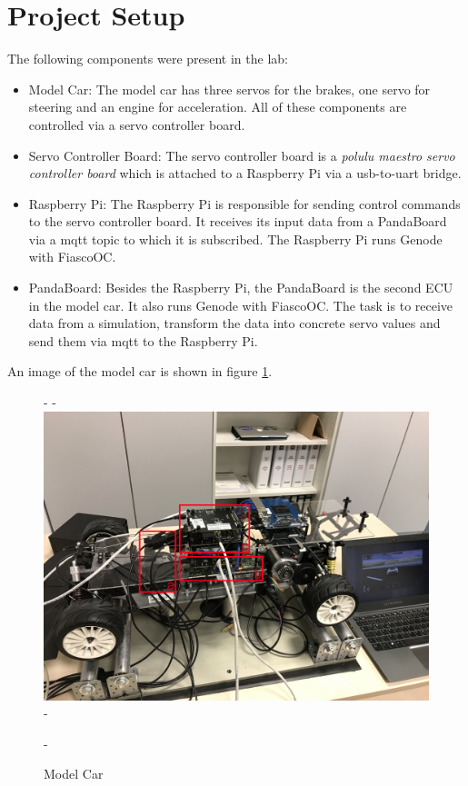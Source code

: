 \section{Project Setup}
The following components were present in the lab:

\begin{itemize}
    \item Model Car: The model car has three servos for the brakes, one servo for steering and an engine for acceleration. All of these components are controlled via a servo controller board.
   
    \item Servo Controller Board: The servo controller board is a \textit{polulu maestro servo controller board} which is attached to a Raspberry Pi via a usb-to-uart bridge.
   
    \item Raspberry Pi: The Raspberry Pi is responsible for sending control commands to the servo controller board. It receives its input data from a PandaBoard via a mqtt topic to which it is subscribed. The Raspberry Pi runs Genode with FiascoOC.
   
    \item PandaBoard: Besides the Raspberry Pi, the PandaBoard is the second ECU in the model car. It also runs Genode with FiascoOC. The task is to receive data from a simulation, transform the data into concrete servo values and send them via mqtt to the Raspberry Pi.
\end{itemize}

An image of the model car is shown in figure \ref{fig:model}.

\begin{figure}[h]
   -    \centering
   -    \includegraphics[width=0.70\linewidth]{images/model}
   -    \caption{Model Car}
   -    \label{fig:model}
\end{figure}


